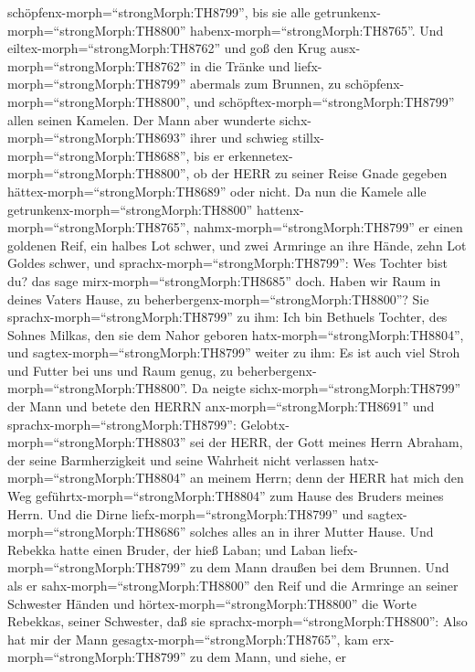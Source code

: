 schöpfenx-morph=``strongMorph:TH8799'', bis sie alle
getrunkenx-morph=``strongMorph:TH8800''
habenx-morph=``strongMorph:TH8765''.  Und
eiltex-morph=``strongMorph:TH8762'' und goß den Krug
ausx-morph=``strongMorph:TH8762'' in die Tränke und
liefx-morph=``strongMorph:TH8799'' abermals zum Brunnen, zu
schöpfenx-morph=``strongMorph:TH8800'', und
schöpftex-morph=``strongMorph:TH8799'' allen seinen Kamelen.
 Der Mann aber wunderte sichx-morph=``strongMorph:TH8693''
ihrer und schwieg stillx-morph=``strongMorph:TH8688'', bis er
erkennetex-morph=``strongMorph:TH8800'', ob der HERR zu seiner Reise
Gnade gegeben hättex-morph=``strongMorph:TH8689'' oder nicht.
 Da nun die Kamele alle
getrunkenx-morph=``strongMorph:TH8800''
hattenx-morph=``strongMorph:TH8765'', nahmx-morph=``strongMorph:TH8799''
er einen goldenen Reif, ein halbes Lot schwer, und zwei Armringe an ihre
Hände, zehn Lot Goldes schwer,  und
sprachx-morph=``strongMorph:TH8799'': Wes Tochter bist du? das sage
mirx-morph=``strongMorph:TH8685'' doch. Haben wir Raum in deines Vaters
Hause, zu beherbergenx-morph=``strongMorph:TH8800''?  Sie
sprachx-morph=``strongMorph:TH8799'' zu ihm: Ich bin Bethuels Tochter,
des Sohnes Milkas, den sie dem Nahor geboren
hatx-morph=``strongMorph:TH8804'',  und
sagtex-morph=``strongMorph:TH8799'' weiter zu ihm: Es ist auch viel
Stroh und Futter bei uns und Raum genug, zu
beherbergenx-morph=``strongMorph:TH8800''.  Da neigte
sichx-morph=``strongMorph:TH8799'' der Mann und betete den HERRN
anx-morph=``strongMorph:TH8691''  und
sprachx-morph=``strongMorph:TH8799'':
Gelobtx-morph=``strongMorph:TH8803'' sei der HERR, der Gott meines Herrn
Abraham, der seine Barmherzigkeit und seine Wahrheit nicht verlassen
hatx-morph=``strongMorph:TH8804'' an meinem Herrn; denn der HERR hat
mich den Weg geführtx-morph=``strongMorph:TH8804'' zum Hause des Bruders
meines Herrn.  Und die Dirne
liefx-morph=``strongMorph:TH8799'' und
sagtex-morph=``strongMorph:TH8686'' solches alles an in ihrer Mutter
Hause.  Und Rebekka hatte einen Bruder, der hieß Laban; und
Laban liefx-morph=``strongMorph:TH8799'' zu dem Mann draußen bei dem
Brunnen.  Und als er sahx-morph=``strongMorph:TH8800'' den
Reif und die Armringe an seiner Schwester Händen und
hörtex-morph=``strongMorph:TH8800'' die Worte Rebekkas, seiner
Schwester, daß sie sprachx-morph=``strongMorph:TH8800'': Also hat mir
der Mann gesagtx-morph=``strongMorph:TH8765'', kam
erx-morph=``strongMorph:TH8799'' zu dem Mann, und siehe, er
